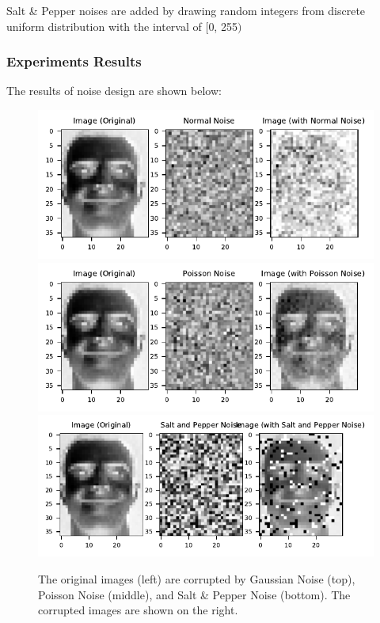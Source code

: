 Salt \& Pepper noises are added by drawing random integers from discrete uniform distribution with the interval of $[$0, 255$)$

\subsubsection{Experiments Results}
The results of noise design are shown below:
\begin{figure}\label{noises}
	\centering
	\includegraphics[scale=.8]{Noise_ORL_Normal_Comparison}\\ %
	\includegraphics[scale=.8]{Noise_ORL_Poisson_Comparison}\\
	\includegraphics[scale=.8]{Noise_ORL_Salt_and_Pepper_Comparison}
	\caption{The original images (left) are corrupted by Gaussian Noise (top), Poisson Noise (middle), and Salt \& Pepper Noise (bottom). The corrupted images are shown on the right.}
	\label{fig:noise}
\end{figure}
